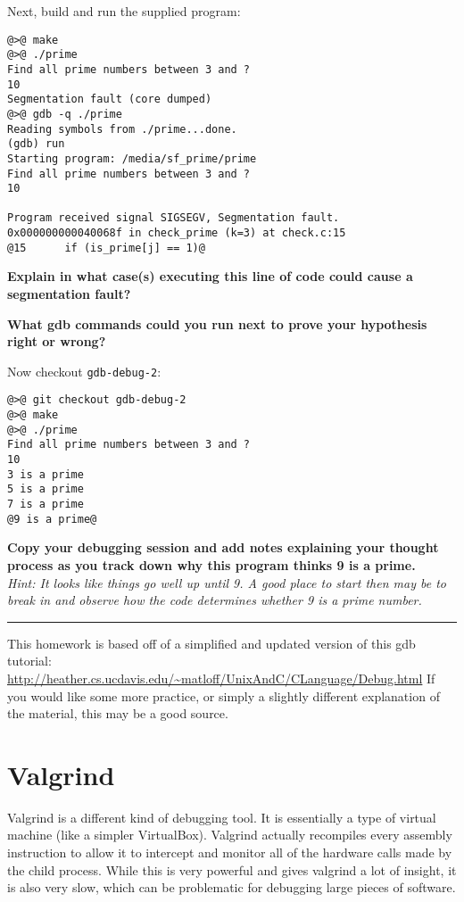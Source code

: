 \documentclass{article}
\begin{document}
Next, build and run the supplied program:
\begin{lstlisting}
@>@ make
@>@ ./prime
Find all prime numbers between 3 and ?
10
Segmentation fault (core dumped)
@>@ gdb -q ./prime
Reading symbols from ./prime...done.
(gdb) run
Starting program: /media/sf_prime/prime 
Find all prime numbers between 3 and ?
10

Program received signal SIGSEGV, Segmentation fault.
0x000000000040068f in check_prime (k=3) at check.c:15
@15      if (is_prime[j] == 1)@
\end{lstlisting}

\textbf{Explain in what case(s) executing this line of code could cause a
  segmentation fault?}
\vspace{3cm}

\textbf{What gdb commands could you run next to prove your hypothesis right or
  wrong?}
\vspace{3cm}


\newpage
Now checkout \texttt{gdb-debug-2}:
\begin{lstlisting}
@>@ git checkout gdb-debug-2
@>@ make
@>@ ./prime
Find all prime numbers between 3 and ?
10
3 is a prime
5 is a prime
7 is a prime
@9 is a prime@
\end{lstlisting}
\textbf{Copy your debugging session and add notes explaining your
  thought process as you track down why this program thinks 9 is a prime.}\\
\emph{\small Hint: It looks like things go well up until 9. A good place to
  start then may be to break in and observe how the code determines whether 9
  is a prime number.}

\vfill
\hrule
{\footnotesize
This homework is based off of a simplified and updated version of this gdb
tutorial:
\url{http://heather.cs.ucdavis.edu/~matloff/UnixAndC/CLanguage/Debug.html}
If you would like some more practice, or simply a slightly different
explanation of the material, this may be a good source.
}


\newpage
\section{Valgrind}

Valgrind is a different kind of debugging tool. It is essentially a type of
virtual machine (like a simpler VirtualBox). Valgrind actually recompiles
every assembly instruction to allow it to intercept and monitor all of the
hardware calls made by the child process. While this is very powerful and
gives valgrind a lot of insight, it is also very slow, which can be
problematic for debugging large pieces of software.
\end{document}
